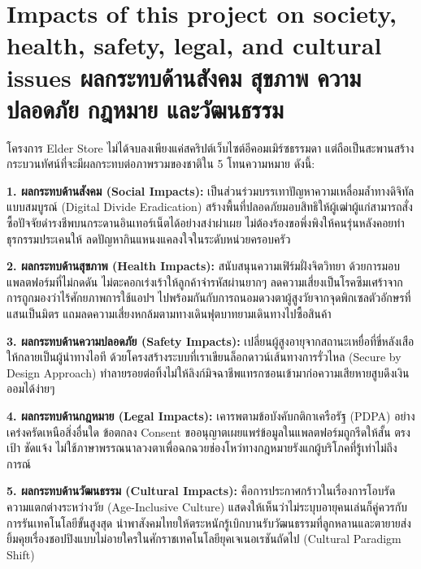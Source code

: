 \section{\ifenglish%
Impacts of this project on society, health, safety, legal, and cultural issues
\else%
ผลกระทบด้านสังคม สุขภาพ ความปลอดภัย กฎหมาย และวัฒนธรรม
\fi}

โครงการ Elder Store ไม่ได้จบลงเพียงแค่สคริปต์เว็บไซต์อีคอมเมิร์ซธรรมดา แต่ถือเป็นสะพานสร้างกระบวนทัศน์ที่จะมีผลกระทบต่อภาพรวมของชาติใน 5 โทนความหมาย ดังนี้:

\textbf{1. ผลกระทบด้านสังคม (Social Impacts):} 
เป็นส่วนร่วมบรรเทาปัญหาความเหลื่อมล้ำทางดิจิทัลแบบสมบูรณ์ (Digital Divide Eradication) สร้างพื้นที่ปลอดภัยมอบสิทธิให้ผู้เฒ่าผู้แก่สามารถสั่งซื้อปัจจัยดำรงชีพบนกระดานอินเทอร์เน็ตได้อย่างสง่าผ่าเผย ไม่ต้องร้องขอพึ่งพิงให้คนรุ่นหลังคอยทำธุรกรรมประเคนให้ ลดปัญหากินแหนงแคลงใจในระดับหน่วยครอบครัว

\textbf{2. ผลกระทบด้านสุขภาพ (Health Impacts):}
สนับสนุนความเฟิร์มฝั่งจิตวิทยา ด้วยการมอบแพลตฟอร์มที่ไม่กดดัน ไม่ตะคอกเร่งเร้าให้ลูกค้าจำรหัสผ่านยากๆ ลดความเสี่ยงเป็นโรคซึมเศร้าจากการถูกมองว่าไร้ศักยภาพการใช้แอปฯ ไปพร้อมกันกับการถนอมดวงตาผู้สูงวัยจากจุดพิกเซลตัวอักษรที่แสนเป็นมิตร แถมลดความเสี่ยงหกล้มตามทางเดินฟุตบาทยามเดินทางไปซื้อสินค้า

\textbf{3. ผลกระทบด้านความปลอดภัย (Safety Impacts):}
เปลี่ยนผู้สูงอายุจากสถานะเหยื่อที่ขี่หลังเสือ ให้กลายเป็นผู้นำทางไอที ด้วยโครงสร้างระบบที่เราเขียนล็อกดาวน์เส้นทางการรั่วไหล (Secure by Design Approach) \cite{pressman2014} ทำลายรอยต่อทิ้งไม่ให้ลิงก์มิจฉาชีพแทรกซอนเข้ามาก่อความเสียหายสูบดึงเงินออมได้ง่ายๆ

\textbf{4. ผลกระทบด้านกฎหมาย (Legal Impacts):}
เคารพตามข้อบังคับกติกาเครือรัฐ (PDPA) อย่างเคร่งครัดเหนือสิ่งอื่นใด ข้อตกลง Consent ขออนุญาตเผยแพร่ข้อมูลในแพลตฟอร์มถูกรีดให้สั้น ตรงเป้า ชัดแจ้ง ไม่ใช้ภาษาพรรณนาลวงตาเพื่อฉกฉวยช่องโหว่ทางกฎหมายรังแกผู้บริโภคที่รู้เท่าไม่ถึงการณ์

\textbf{5. ผลกระทบด้านวัฒนธรรม (Cultural Impacts):}
คือการประกาศกร้าวในเรื่องการโอบรัดความแตกต่างระหว่างวัย (Age-Inclusive Culture) แสดงให้เห็นว่าไม่ระบุบอายุคนเล่นก็คู่ควรกับการรันเทคโนโลยีขั้นสูงสุด นำพาสังคมไทยให้ตระหนักรู้เบิกบานรับวัฒนธรรมที่ลูกหลานและตายายส่งยิ้มคุยเรื่องชอปปิงแบบไม่อายใครในศักราชเทคโนโลยียุคเจเนอเรชันถัดไป (Cultural Paradigm Shift)
